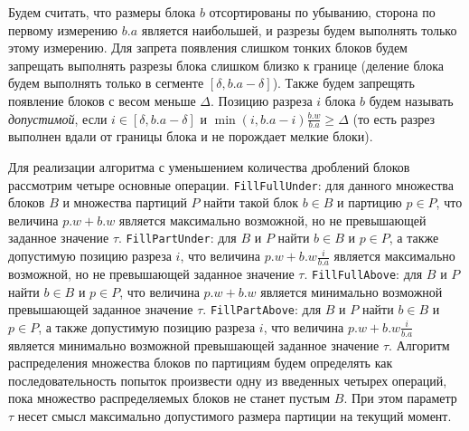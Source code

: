 \documentclass[a4paper,14pt]{extarticle}                     %
\theoremstyle{plain}                                         %
\begin{document}
Будем считать, что размеры блока $b$ отсортированы по убыванию, сторона по первому измерению $b.a$ является наибольшей, и разрезы будем выполнять только этому измерению.
Для запрета появления слишком тонких блоков будем запрещать выполнять разрезы блока слишком близко к границе (деление блока будем выполнять только в сегменте $[\delta, b.a - \delta]$).
Также будем запрещять появление блоков с весом меньше $\Delta$.
Позицию разреза $i$ блока $b$ будем называть \textit{допустимой}, если $i \in [\delta, b.a - \delta]$ и $\min(i, b.a - i)\frac{b.w}{b.a} \ge \Delta$ (то есть разрез выполнен вдали от границы блока и не порождает мелкие блоки).

Для реализации алгоритма с уменьшением количества дроблений блоков рассмотрим четыре основные операции.
\texttt{FillFullUnder}: для данного множества блоков $B$ и множества партиций $P$ найти такой блок $b \in B$ и партицию $p \in P$, что величина $p.w + b.w$ является максимально возможной, но не превышающей заданное значение $\tau$.
\texttt{FillPartUnder}: для $B$ и $P$ найти $b \in B$ и $p \in P$, а также допустимую позицию разреза $i$, что величина $p.w + b.w \frac{i}{b.a}$ является максимально возможной, но не превышающей заданное значение $\tau$.
\texttt{FillFullAbove}: для $B$ и $P$ найти $b \in B$ и $p \in P$, что величина $p.w + b.w$ является минимально возможной превышающей заданное значение $\tau$.
\texttt{FillPartAbove}: для $B$ и $P$ найти $b \in B$ и $p \in P$, а также допустимую позицию разреза $i$, что величина $p.w + b.w \frac{i}{b.a}$ является минимально возможной превышающей заданное значение $\tau$.
Алгоритм распределения множества блоков по партициям будем определять как последовательность попыток произвести одну из введенных четырех операций, пока множество распределяемых блоков не станет пустым $B$.
При этом параметр $\tau$ несет смысл максимально допустимого размера партиции на текущий момент.
\end{document}
